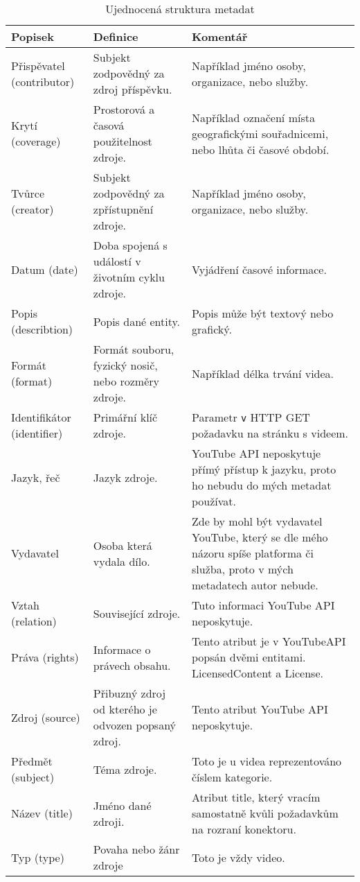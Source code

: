 \begin{table}[h!]
\begin{tabular}{|p{} | p{} | p{}|}
\hline
Popisek & Definice & Komentář\\
\hline
Přispěvatel (contributor) & Subjekt zodpovědný za zdroj příspěvku. & Například jméno osoby, organizace, nebo služby.\\
\hline
Krytí (coverage) & Prostorová a časová použitelnost zdroje. & Například označení místa geografickými souřadnicemi, nebo lhůta či časové období.\\
\hline
Tvůrce (creator) & Subjekt zodpovědný za zpřístupnění zdroje. & Například jméno osoby, organizace, nebo služby.\\
\hline
Datum (date) & Doba spojená s událostí v životním cyklu zdroje. & Vyjádření časové informace. \\
\hline
Popis (describtion) & Popis dané entity. & Popis může být textový nebo grafický. \\
\hline
Formát (format) & Formát souboru, fyzický nosič, nebo rozměry zdroje. & Například délka trvání videa. \\
\hline
Identifikátor (identifier) & Primářní klíč zdroje. & Parametr \texttt{v} HTTP GET požadavku na stránku s videem.\\
\hline
Jazyk, řeč & Jazyk zdroje. & YouTube API neposkytuje přímý přístup k jazyku, proto ho nebudu do mých metadat používat.\\
\hline
Vydavatel & Osoba která vydala dílo. & Zde by mohl být vydavatel YouTube, který se dle mého názoru spíše platforma či služba, proto v mých metadatech autor nebude.\\
\hline
Vztah (relation) & Související zdroje. & Tuto informaci YouTube API neposkytuje.\\
\hline
Práva (rights) & Informace o právech obsahu. & Tento atribut je v YouTubeAPI popsán dvěmi entitami. LicensedContent a License.\\
\hline
Zdroj (source) & Přibuzný zdroj od kterého je odvozen popsaný zdroj. & Tento atribut YouTube API neposkytuje.\\
\hline
Předmět (subject) & Téma zdroje. & Toto je u videa reprezentováno číslem kategorie.\\
\hline
Název (title) & Jméno dané zdroji. & Atribut title, který vracím samostatně kvůli požadavkům na rozraní konektoru.\\
\hline
Typ (type) & Povaha nebo žánr zdroje & Toto je vždy video.\\
\hline
\end{tabular}
\caption[DublinCore metadata]{Ujednocená struktura metadat}\label{tab:dublincore1}
\end{table}
\hfill